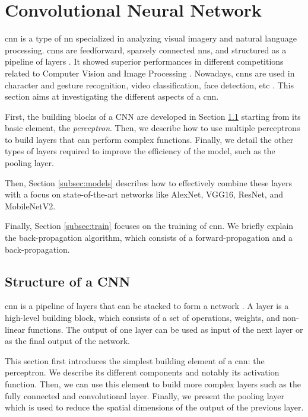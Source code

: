 \section{Convolutional Neural Network} \label{sec:cnn}
\acrshort{cnn} is a type of \acrshort{nn} specialized in analyzing visual imagery and natural language processing. \acrshort{cnn}s are feedforward, sparsely connected \acrshort{nn}s, and structured as a pipeline of layers \cite{abdelouahab_accelerating_2018}. It showed superior performances in different competitions related to Computer Vision and Image Processing \cite{khan_survey_2020}. Nowadays, \acrshort{cnn}s are used in character and gesture recognition, video classification, face detection, etc \cite{shawahna_fpga-based_2019}. This section aims at investigating the different aspects of a \acrshort{cnn}.

First, the building blocks of a CNN are developed in Section \ref{subsec:layer} starting from its basic element, the \textit{perceptron}. Then, we describe how to use multiple perceptrons to build layers that can perform complex functions. Finally, we detail the other types of layers required to improve the efficiency of the model, such as the pooling layer.

Then, Section \ref{subsec:models} describes how to effectively combine these layers with a focus on state-of-the-art networks like AlexNet, VGG16, ResNet, and MobileNetV2.

Finally, Section \ref{subsec:train} focuses on the training of \acrshort{cnn}. We briefly explain the back-propagation algorithm, which consists of a forward-propagation and a back-propagation.
%
%
\subsection{Structure of a CNN} \label{subsec:layer}
%
\acrshort{cnn} is a pipeline of layers that can be stacked to form a network \cite{abdelouahab_accelerating_2018}. A layer is a high-level building block, which consists of a set of operations, weights, and non-linear functions. The output of one layer can be used as input of the next layer or as the final output of the network. 

This section first introduces the simplest building element of a \acrshort{cnn}: the perceptron. We describe its different components and notably its activation function. Then, we can use this element to build more complex layers such as the fully connected and convolutional layer. Finally, we present the pooling layer which is used to reduce the spatial dimensions of the output of the previous layer.
%
%

%

%

%

%

%

%
